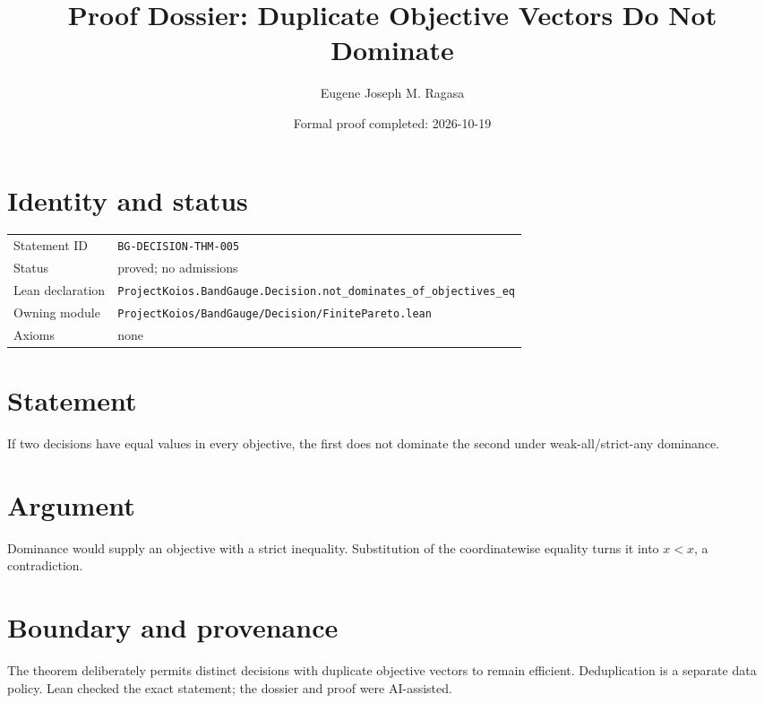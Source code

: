 \documentclass[11pt]{article}
\title{Proof Dossier: Duplicate Objective Vectors Do Not Dominate}
\author{Eugene Joseph M. Ragasa}
\date{Formal proof completed: 2026-10-19}
\begin{document}
\maketitle
\section{Identity and status}
\begin{tabularx}{\textwidth}{@{}lX@{}}\toprule
Statement ID & \texttt{BG-DECISION-THM-005} \\
Status & proved; no admissions \\
Lean declaration & \texttt{ProjectKoios.BandGauge.Decision.not\_dominates\_of\_objectives\_eq} \\
Owning module & \texttt{ProjectKoios/BandGauge/Decision/FinitePareto.lean} \\
Axioms & none \\
\bottomrule\end{tabularx}
\section{Statement}
If two decisions have equal values in every objective, the first does not dominate the
second under weak-all/strict-any dominance.
\section{Argument}
Dominance would supply an objective with a strict inequality. Substitution of the
coordinatewise equality turns it into $x<x$, a contradiction.
\section{Boundary and provenance}
The theorem deliberately permits distinct decisions with duplicate objective vectors to
remain efficient. Deduplication is a separate data policy. Lean checked the exact
statement; the dossier and proof were AI-assisted.
\end{document}
